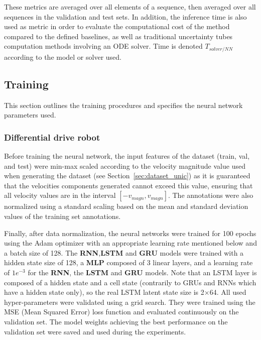 These metrics are averaged over all elements of a sequence, then averaged over all sequences in the validation and test sets. 
In addition, the inference time is also used as metric in order to evaluate the computational cost of the method compared to the defined baselines, as well as traditional uncertainty tubes computation methods involving an ODE solver. 
Time is denoted $T_{solver/NN}$ according to the model or solver used.

\subsection{Training}

This section outlines the training procedures and specifies the neural network parameters used.

\subsubsection{Differential drive robot}

Before training the neural network, the input features of the dataset (train, val, and test) were min-max scaled according to the velocity magnitude value used when generating the dataset (see Section~\ref{sec:dataset_unic}) as it is guaranteed that the velocities components generated cannot exceed this value, ensuring that all velocity values are in the interval $[-v_{magn}, v_{magn}]$.  
The annotations were also normalized using a standard scaling based on the mean and standard deviation values of the training set annotations.

Finally, after data normalization, the neural networks were trained for 100 epochs using the Adam optimizer \cite{kingma2014adam} with an appropriate learning rate mentioned below and a batch size of 128. 
The \textbf{RNN},\textbf{LSTM} and \textbf{GRU} models were trained with a hidden state size of 128, a \textbf{MLP} composed of 3 linear layers, and a learning rate of $1e^{-3}$ for the \textbf{RNN}, the \textbf{LSTM} and \textbf{GRU} models.
Note that an LSTM layer is composed of a hidden state and a cell state (contrarily to GRUs and RNNs which have a hidden state only), so the real LSTM latent state size is 2$\times$64.
All used hyper-parameters were validated using a grid search.
They were trained using the MSE (Mean Squared Error) loss function and evaluated continuously on the validation set. 
The model weights achieving the best performance on the validation set were saved and used during the experiments.

